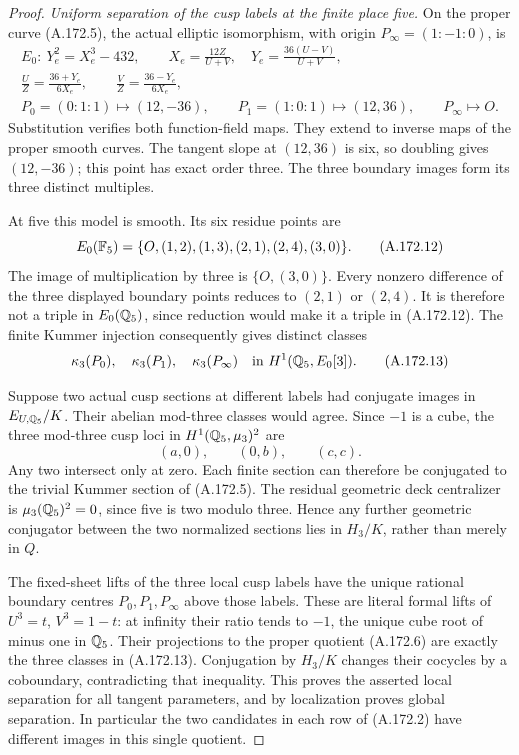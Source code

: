 \begin{proof}
\emph{Uniform separation of the cusp labels at the finite place five.}
On the proper curve (A.172.5), the actual elliptic isomorphism,
with origin \(P_\infty=(1:-1:0)\), is
\[
 \begin{gathered}
 E_0:\ Y_e^2=X_e^3-432,\qquad
 X_e=\frac{12Z}{U+V},\quad Y_e=\frac{36(U-V)}{U+V},\\
 \frac UZ=\frac{36+Y_e}{6X_e},\qquad
 \frac VZ=\frac{36-Y_e}{6X_e},\\
 P_0=(0:1:1)\mapsto(12,-36),\qquad
 P_1=(1:0:1)\mapsto(12,36),\qquad P_\infty\mapsto O.
 \end{gathered}
\tag{A.172.11}
\]
Substitution verifies both function-field maps.  They extend to
inverse maps of the proper smooth curves.  The tangent slope at
\((12,36)\) is six, so doubling gives \((12,-36)\); this
point has exact order three.  The three boundary images form its
three distinct multiples.

At five this model is smooth.  Its six residue points are
\[
      E_0(\mathbb F_5)=\{O,(1,2),(1,3),(2,1),(2,4),(3,0)\}.
\tag{A.172.12}
\]
The image of multiplication by three is \(\{O,(3,0)\}\).
Every nonzero difference of the three displayed boundary points
reduces to \((2,1)\) or \((2,4)\).  It is therefore not a
triple in \(E_0(\mathbb Q_5)\), since reduction would make it a
triple in (A.172.12).  The finite Kummer injection consequently
gives distinct classes
\[
             \kappa_3(P_0),\quad\kappa_3(P_1),\quad
                  \kappa_3(P_\infty)
                   \quad\text{in }H^1(\mathbb Q_5,E_0[3]).
\tag{A.172.13}
\]

Suppose two actual cusp sections at different labels had conjugate
images in \(E_{U,\mathbb Q_5}/K\).  Their abelian mod-three classes
would agree.  Since \(-1\) is a cube, the three mod-three cusp
loci in \(H^1(\mathbb Q_5,\mu_3)^2\) are
\[
                  (a,0),\qquad(0,b),\qquad(c,c).
\tag{A.172.14}
\]
Any two intersect only at zero.  Each finite section can therefore
be conjugated to the trivial Kummer section of (A.172.5).
The residual geometric deck centralizer is
\(\mu_3(\mathbb Q_5)^2=0\), since five is two modulo three.
Hence any further geometric conjugator between the two normalized
sections lies in \(H_3/K\), rather than merely in \(Q\).

The fixed-sheet lifts of the three local cusp labels have the
unique rational boundary centres \(P_0,P_1,P_\infty\) above
those labels.  These are literal formal lifts of
\(U^3=t\), \(V^3=1-t\): at infinity their ratio tends to
\(-1\), the unique cube root of minus one in \(\mathbb Q_5\).
Their projections to the proper quotient (A.172.6) are exactly
the three classes in (A.172.13).  Conjugation by \(H_3/K\)
changes their cocycles by a coboundary, contradicting that
inequality.  This proves the asserted local separation for all
tangent parameters, and by localization proves global separation.
In particular the two candidates in each row of (A.172.2) have
different images in this single quotient.


\end{proof}

